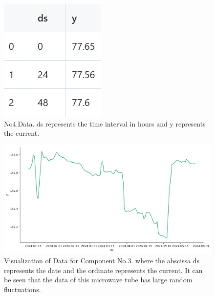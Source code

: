 \begin{figure}[H]
  \centering
     \includegraphics[scale=0.6]{figures/No.4data} %

   \caption{No4.Data.
  ds represents the time interval in hours and y represents the current.}
   \label{fig:onecol}
\end{figure}

\begin{figure}[H]
  \centering
     \includegraphics[width=\linewidth]{figures/No.3data} 
     



   \caption{Visualization of Data for Component No.3. where the abscissa ds represents the date and the ordinate represents the current. It can be seen that the data of this microwave tube has large random fluctuations.}
   \label{fig:onecol}
\end{figure}
